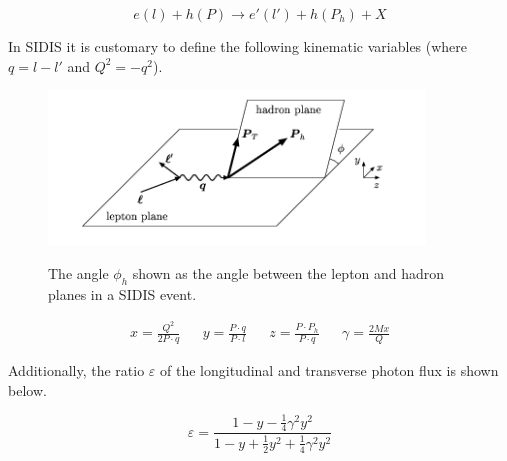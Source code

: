 \begin{equation}
  e(l) + h(P) \rightarrow e'(l') + h(P_{h}) + X 
\end{equation}

In SIDIS it is customary to define the following kinematic variables (where $q = l - l'$ and $Q^{2} = -q^{2}$). 

\begin{figure}
  \centering
  \includegraphics[width=10cm]{image/PhiHadron.png}
  \label{fig:dis}
  \caption{ The angle $\phi_h$ shown as the angle between the lepton and hadron planes in a SIDIS event. }
\end{figure}

\begin{align}
  x = \frac{Q^{2}}{2P \cdot q} && y = \frac{P \cdot q}{P \cdot l} && z = \frac{P \cdot P_{h}}{P \cdot q} && \gamma = \frac{2Mx}{Q}
\end{align}

Additionally, the ratio $\varepsilon$ of the longitudinal and transverse photon flux is shown below.

\begin{equation}
	\varepsilon = \frac{1 - y - \frac{1}{4}\gamma^2 y^2}{1 - y + \frac{1}{2}y^2 + \frac{1}{4}\gamma^2 y^2}
\end{equation}

